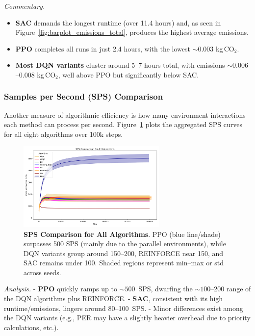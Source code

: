 \noindent
\emph{Commentary.}
\begin{itemize}
	\item \textbf{SAC} demands the longest runtime (over 11.4 hours) and, as seen in 
	Figure~\ref{fig:barplot_emissions_total}, produces the highest average emissions. 
	\item \textbf{PPO} completes all runs in just 2.4 hours, with the lowest \(\sim0.003\) 
	kg\,CO$_2$. 
	\item \textbf{Most DQN variants} cluster around 5--7 hours total, with emissions 
	\(\sim0.006\)--0.008 kg\,CO$_2$, well above PPO but significantly below SAC.
\end{itemize}

\subsubsection{Samples per Second (SPS) Comparison}
Another measure of algorithmic efficiency is how many environment interactions each method 
can process per second. Figure~\ref{fig:sps_all} plots the aggregated SPS curves for all 
eight algorithms over 100k steps.

\begin{figure} 
	\centering
	\includegraphics[width=0.65\textwidth]{figures/comparison/sps_all.png}
	\caption{\textbf{SPS Comparison for All Algorithms}. PPO (blue line/shade) surpasses 
		500 SPS (mainly due to the parallel environments), while DQN variants group around 150--200, REINFORCE near 150, and SAC remains 
		under 100. Shaded regions represent min--max or std across seeds.}
	\label{fig:sps_all}
\end{figure}

\noindent
\emph{Analysis.} 
- \textbf{PPO} quickly ramps up to $\sim500$~SPS, dwarfing the $\sim100$--200 range of the DQN 
algorithms plus REINFORCE. 
- \textbf{SAC}, consistent with its high runtime/emissions, lingers around 80--100~SPS. 
- Minor differences exist among the DQN variants (e.g., PER may have a slightly heavier overhead 
due to priority calculations, etc.).

